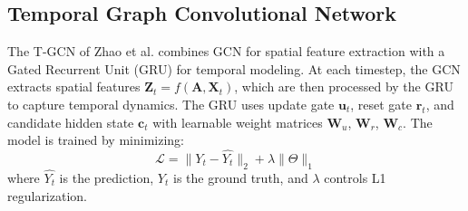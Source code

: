 \subsection{Temporal Graph Convolutional Network}

The T-GCN of Zhao et al. \citep{zhao2019t} combines GCN for spatial feature extraction with a Gated Recurrent Unit (GRU) for temporal modeling. At each timestep, the GCN extracts spatial features $\mathbf{Z}_t=f(\mathbf{A},\mathbf{X}_t)$, which are then processed by the GRU to capture temporal dynamics. The GRU uses update gate $\mathbf{u}_t$, reset gate $\mathbf{r}_t$, and candidate hidden state $\mathbf{c}_t$ with learnable weight matrices $\mathbf{W}_u$, $\mathbf{W}_r$, $\mathbf{W}_c$. The model is trained by minimizing:
\begin{equation}
\mathcal{L}=\| Y_{t}-\widehat{Y_{t}}\|_2+\lambda \|\Theta\|_1
\end{equation}
where $\widehat{Y_{t}}$ is the prediction, $Y_t$ is the ground truth, and $\lambda$ controls L1 regularization.
